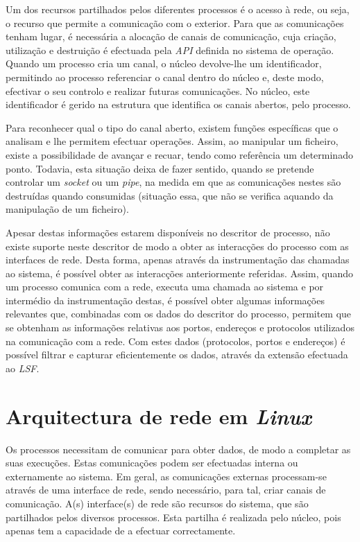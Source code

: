 Um dos recursos partilhados pelos diferentes processos é o acesso à rede, ou seja, o recurso que permite a comunicação com o exterior.
Para que as comunicações tenham lugar, é necessária a alocação de canais de comunicação, cuja criação, utilização e destruição é efectuada pela \textit{API} definida no sistema de operação.
Quando um processo cria um canal, o núcleo devolve-lhe um identificador, permitindo ao processo referenciar o canal dentro do núcleo e, deste modo, efectivar o seu controlo e realizar futuras comunicações.
No núcleo, este identificador é gerido na estrutura que identifica os canais abertos, pelo processo.

Para reconhecer qual o tipo do canal aberto, existem funções específicas que o analisam e lhe permitem efectuar operações.
Assim, ao manipular um ficheiro, existe a possibilidade de avançar e recuar, tendo como referência um determinado ponto.
Todavia, esta situação deixa de fazer sentido, quando se pretende controlar um \textit{socket} ou um \textit{pipe}, na medida em que as comunicações nestes são destruídas quando consumidas (situação essa, que não se verifica aquando da manipulação de um ficheiro).

Apesar destas informações estarem disponíveis no descritor de processo, não existe suporte neste descritor de modo a obter as interacções do processo com as interfaces de rede.
Desta forma, apenas através da instrumentação das chamadas ao sistema, é possível obter as interacções anteriormente referidas.
Assim, quando um processo comunica com a rede, executa uma chamada ao sistema e por intermédio da instrumentação destas, é possível obter algumas informações relevantes que, combinadas com os dados do descritor do processo, permitem que se obtenham as informações relativas aos portos, endereços e protocolos utilizados na comunicação com a rede.
Com estes dados (protocolos, portos e endereços) é possível filtrar e capturar eficientemente os dados, através da extensão efectuada ao \textit{LSF}.

\section{Arquitectura de rede em \textit{Linux}}
\label{sub:network}

Os processos necessitam de comunicar para obter dados, de modo a completar as suas execuções.
Estas comunicações podem ser efectuadas interna ou externamente ao sistema.
Em geral, as comunicações externas processam-se através de uma interface de rede, sendo necessário, para tal, criar canais de comunicação.
A(s) interface(s) de rede são recursos do sistema, que são partilhados pelos diversos processos.
Esta partilha é realizada pelo núcleo, pois apenas tem a capacidade de a efectuar correctamente.

